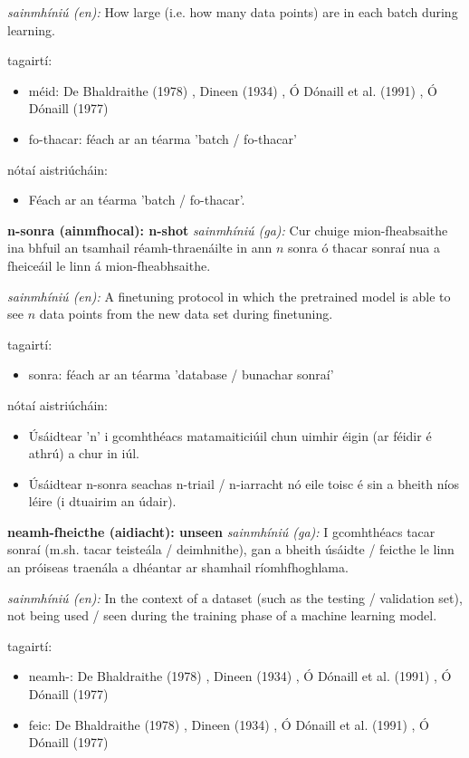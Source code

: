 \documentclass{article}
\begin{document}
\textit{sainmhíniú (en):} How large (i.e. how many data points) are in each batch during learning.

tagairtí:
\begin{itemize}
	\item méid: De Bhaldraithe (1978) \cite{de-bhaldraithe}, Dineen (1934) \cite{dineen}, Ó Dónaill et al. (1991) \cite{focloir-beag}, Ó Dónaill (1977) \cite{odonaill}
	\item fo-thacar: féach ar an téarma 'batch / fo-thacar'
\end{itemize}

nótaí aistriúcháin:
\begin{itemize}
	\item Féach ar an téarma 'batch / fo-thacar'.
\end{itemize}


\textbf{n-sonra (ainmfhocal): n-shot}
\textit{sainmhíniú (ga):} Cur chuige mion-fheabsaithe ina bhfuil an tsamhail réamh-thraenáilte in ann $n$ sonra ó thacar sonraí nua a fheiceáil le linn á mion-fheabhsaithe.

\textit{sainmhíniú (en):} A finetuning protocol in which the pretrained model is able to see $n$ data points from the new data set during finetuning.

tagairtí:
\begin{itemize}
	\item sonra: féach ar an téarma 'database / bunachar sonraí'
\end{itemize}

nótaí aistriúcháin:
\begin{itemize}
	\item Úsáidtear 'n' i gcomhthéacs matamaiticiúil chun uimhir éigin (ar féidir é athrú) a chur in iúl.
	\item Úsáidtear n-sonra seachas n-triail / n-iarracht nó eile toisc é sin a bheith níos léire (i dtuairim an údair).
\end{itemize}


\textbf{neamh-fheicthe (aidiacht): unseen}
\textit{sainmhíniú (ga):} I gcomhthéacs tacar sonraí (m.sh. tacar teisteála / deimhnithe), gan a bheith úsáidte / feicthe le linn an próiseas traenála a dhéantar ar shamhail ríomhfhoghlama.

\textit{sainmhíniú (en):} In the context of a dataset (such as the testing / validation set), not being used / seen during the training phase of a machine learning model.

tagairtí:
\begin{itemize}
	\item neamh-: De Bhaldraithe (1978) \cite{de-bhaldraithe}, Dineen (1934) \cite{dineen}, Ó Dónaill et al. (1991) \cite{focloir-beag}, Ó Dónaill (1977) \cite{odonaill}
	\item feic: De Bhaldraithe (1978) \cite{de-bhaldraithe}, Dineen (1934) \cite{dineen}, Ó Dónaill et al. (1991) \cite{focloir-beag}, Ó Dónaill (1977) \cite{odonaill}
\end{itemize}
\end{document}

